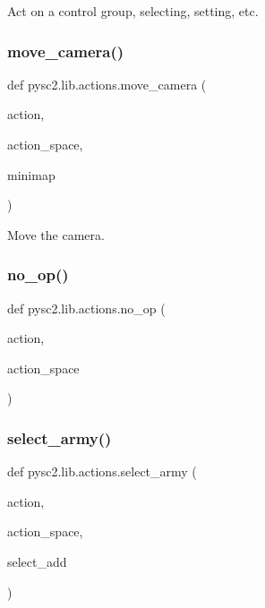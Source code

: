 \begin{DoxyVerb}Act on a control group, selecting, setting, etc.\end{DoxyVerb}
 \mbox{\label{namespacepysc2_1_1lib_1_1actions_ab895c4b3b0840b1739c9569f89c76c1b}} 
\subsubsection{\texorpdfstring{move\+\_\+camera()}{move\_camera()}}
{\footnotesize\ttfamily def pysc2.\+lib.\+actions.\+move\+\_\+camera (\begin{DoxyParamCaption}\item[{}]{action,  }\item[{}]{action\+\_\+space,  }\item[{}]{minimap }\end{DoxyParamCaption})}

\begin{DoxyVerb}Move the camera.\end{DoxyVerb}
 \mbox{\label{namespacepysc2_1_1lib_1_1actions_aa1af27a4635aaac6b6cf8318b0b13ca3}} 
\subsubsection{\texorpdfstring{no\+\_\+op()}{no\_op()}}
{\footnotesize\ttfamily def pysc2.\+lib.\+actions.\+no\+\_\+op (\begin{DoxyParamCaption}\item[{}]{action,  }\item[{}]{action\+\_\+space }\end{DoxyParamCaption})}

\mbox{\label{namespacepysc2_1_1lib_1_1actions_a55445acf167169d48bfc90afdcd703f4}} 
\subsubsection{\texorpdfstring{select\+\_\+army()}{select\_army()}}
{\footnotesize\ttfamily def pysc2.\+lib.\+actions.\+select\+\_\+army (\begin{DoxyParamCaption}\item[{}]{action,  }\item[{}]{action\+\_\+space,  }\item[{}]{select\+\_\+add }\end{DoxyParamCaption})}

